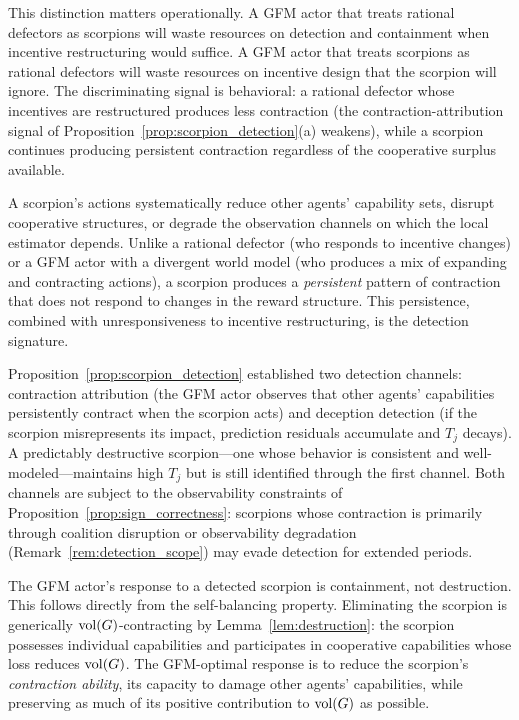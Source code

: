 This distinction matters operationally. A GFM actor that treats rational
defectors as scorpions will waste resources on detection and containment when
incentive restructuring would suffice. A GFM actor that treats scorpions as
rational defectors will waste resources on incentive design that the scorpion
will ignore. The discriminating signal is behavioral: a rational defector whose
incentives are restructured produces less contraction (the
contraction-attribution signal of Proposition~\ref{prop:scorpion_detection}(a)
weakens), while a scorpion continues producing persistent contraction
regardless of the cooperative surplus available.

A scorpion's actions systematically reduce other agents' capability sets,
disrupt cooperative structures, or degrade the observation channels on which
the local estimator depends. Unlike a rational defector (who responds to
incentive changes) or a GFM actor with a divergent world model (who produces a
mix of expanding and contracting actions), a scorpion produces a
\emph{persistent} pattern of contraction that does not respond to changes in
the reward structure. This persistence, combined with unresponsiveness to
incentive restructuring, is the detection signature.

Proposition~\ref{prop:scorpion_detection} established two detection channels:
contraction attribution (the GFM actor observes that other agents' capabilities
persistently contract when the scorpion acts) and deception detection (if the
scorpion misrepresents its impact, prediction residuals accumulate and $T_j$
decays). A predictably destructive scorpion---one whose behavior is consistent
and well-modeled---maintains high $T_j$ but is still identified through the
first channel. Both channels are subject to the observability constraints of
Proposition~\ref{prop:sign_correctness}: scorpions whose contraction is
primarily through coalition disruption or observability degradation
(Remark~\ref{rem:detection_scope}) may evade detection for extended periods.

The GFM actor's response to a detected scorpion is containment, not
destruction. This follows directly from the self-balancing property.
Eliminating the scorpion is generically $\operatorname{vol}(G)$-contracting by
Lemma~\ref{lem:destruction}: the scorpion possesses individual capabilities and
participates in cooperative capabilities whose loss reduces $\operatorname{vol}(G)$. The
GFM-optimal response is to reduce the scorpion's \emph{contraction ability},
its capacity to damage other agents' capabilities, while preserving as much of
its positive contribution to $\operatorname{vol}(G)$ as possible.

